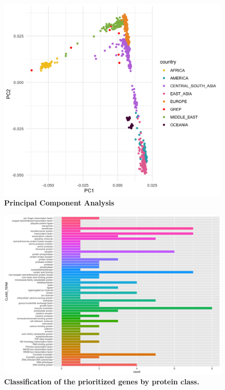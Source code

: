 \begin{figure}[ht]
    \centering
    \includegraphics[width= 14 cm, high= 16cm]{fig/pca_hgdp-grep_noALPHA.png}
    \caption{\textbf{Principal Component Analysis  }}
    \label{fig:pca}
\end{figure}


\begin{figure}[ht]
    \centering
    \includegraphics[width= 14 cm, high= 16cm]{fig/class_term_grep.png}
    \caption{\textbf{Classification of the prioritized genes by protein class. }}
    \label{fig:protClass}
\end{figure}


